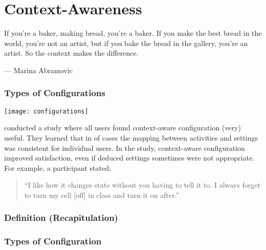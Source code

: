 \section{Context-Awareness}

\begin{frame}
	If you're a baker, making bread, you're a baker. If you make the best bread in the world, you're not an artist, but if you bake the bread in the gallery, you're an artist. So the context makes the difference.\par\raggedleft--- \textup{Marina Abramovic}
\end{frame}

\begin{frame}
	\frametitle{Types of Configurations}
	\hspace*{-1em}\texttt{[image: configurations]}
\end{frame}


\begin{frame}
	\citet{khalil2005context} conducted a study where all users found context-aware configuration (very) useful.
	They learned that in  of cases the mapping between activities and settings was consistent for individual users.
	In the study, context-aware configuration improved satisfaction, even if deduced settings sometimes were not appropriate.
	For example, a participant stated:
	\vspace{2em}

	\begin{quote}
	``I like how it changes state without you having to tell it to. I always forget to turn my cell [off] in class and turn it on after.''
	\end{quote}
\end{frame}

\begin{frame}
	\frametitle{Definition (Recapitulation)}
\end{frame}

\begin{frame}
	\frametitle{Types of Configuration}
	\begin{description}
	\end{description}
\end{frame}

